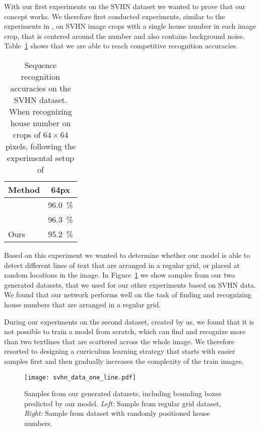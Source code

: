\documentclass[letterpaper]{article}
\begin{document}
	With our first experiments on the SVHN dataset \cite{Netzer2011Reading} we wanted to prove that our concept works.
	We therefore first conducted experiments, similar to the experiments in \cite{Jaderberg2015Spatial}, on SVHN image crops with a single house number in each image crop, that is centered around the number and also contains background noise.
	Table~\ref{tab:svhn_results} shows that we are able to reach competitive recognition accuracies.

	\begin{table}
		\begin{center}
			\begin{tabular}{|l|c|}
				\hline
				Method & 64px \\
				\hline
				\cite{Goodfellow2014MultiDigit} & \SI{96.0}{\percent} \\
				\cite{Jaderberg2015Spatial} & \SI{96.3}{\percent} \\
				\hline
				Ours & \SI{95.2}{\percent} \\
				\hline
			\end{tabular}
		\end{center}
		\caption{Sequence recognition accuracies on the SVHN dataset. When recognizing house number on crops of $64 \times 64$ pixels, following the experimental setup of \cite{Goodfellow2014MultiDigit}}
		\label{tab:svhn_results}
	\end{table}

	Based on this experiment we wanted to determine whether our model is able to detect different lines of text that are arranged in a regular grid, or placed at random locations in the image.
	In Figure~\ref{fig:svhn_grid_dataset} we show samples from our two generated datasets, that we used for our other experiments based on SVHN data.
	We found that our network performs well on the task of finding and recognizing house numbers that are arranged in a regular grid.

	During our experiments on the second dataset, created by us, we found that it is not possible to train a model from scratch, which can find and recognize more than two textlines that are scattered across the whole image.
	We therefore resorted to designing a curriculum learning strategy that starts with easier samples first and then gradually increases the complexity of the train images.

	\begin{figure}[t]
		\centering
		\texttt{[image: svhn\_data\_one\_line.pdf]}
		\caption{Samples from our generated datasets, including bounding boxes predicted by our model. \textit{Left:} Sample from regular grid dataset, \textit{Right:} Sample from dataset with randomly positioned house numbers.}
		\label{fig:svhn_grid_dataset}
	\end{figure}
\end{document}
